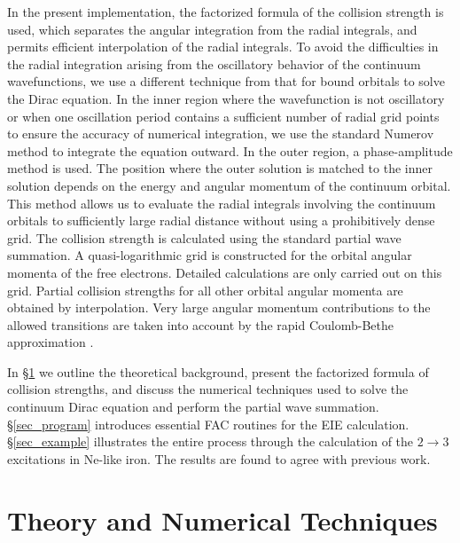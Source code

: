 \documentclass{elsart}
\begin{document}
In the present implementation, the factorized formula of the collision
strength is used, which separates the angular integration from the radial
integrals, and permits efficient interpolation of the radial integrals. To
avoid the difficulties in the radial integration arising from the oscillatory
behavior of the continuum wavefunctions, we use a different technique from
that for bound orbitals to solve the Dirac equation. In the inner region where
the wavefunction is not oscillatory or when one oscillation period contains
a sufficient number of radial grid points to ensure the accuracy of numerical
integration, we use the standard Numerov method to integrate the equation 
outward. In the outer region, a phase-amplitude method is used. The position
where the outer solution is matched to the inner solution depends on the
energy and angular momentum of the continuum orbital. This method allows us to
evaluate the radial integrals involving the continuum orbitals to sufficiently
large radial distance without using a prohibitively dense grid. The collision
strength is calculated using the standard partial wave summation. A
quasi-logarithmic grid is constructed for the orbital angular momenta of the
free electrons. Detailed calculations are only carried out on this
grid. Partial collision strengths for all other orbital angular momenta are
obtained by interpolation. Very large
angular momentum contributions to the allowed transitions
are taken into account by the rapid Coulomb-Bethe approximation
\citep{burgess74}. 

In \S\ref{sec_theory} we outline the theoretical background, present the
factorized formula of collision strengths, and discuss the numerical
techniques used to solve the continuum Dirac equation and perform the partial
wave summation. \S\ref{sec_program} introduces essential FAC routines for the
EIE calculation. \S\ref{sec_example} illustrates the entire process through the
calculation of the $2\rightarrow 3$ excitations in Ne-like iron. The results
are found to agree with previous work.

\section{Theory and Numerical Techniques}
\label{sec_theory}
\end{document}
